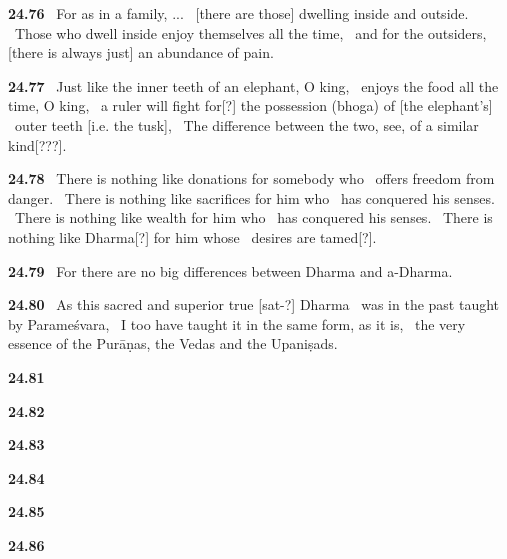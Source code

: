 \documentclass{article}
\begin{document}
\textbf{24.76}%
\ For as in a family, ...%
\ [there are those] dwelling inside and outside.%
\ Those who dwell inside enjoy themselves all the time,%
\ and for the outsiders, [there is always just] an abundance of pain.%


\textbf{24.77}%
\ Just like the inner teeth of an elephant, O king,%
\ enjoys the food all the time, O king,%
\ a ruler will fight for[?] the possession (bhoga) of [the elephant's]%
\                 outer teeth [i.e. the tusk],%
\ The difference between the two, see, of a similar kind[???].%


\textbf{24.78}%
\ There is nothing like donations for somebody who%
\                 offers freedom from danger.%
\ There is nothing like sacrifices for him who%
\                         has conquered his senses.%
\ There is nothing like wealth for him who%
\                         has conquered his senses.%
\ There is nothing like Dharma[?] for him whose%
\                         desires are tamed[?].%


\textbf{24.79}%
\ For there are no big differences between Dharma and a-Dharma.%


\textbf{24.80}%
\ As this sacred and superior true [sat-?] Dharma%
\                 was in the past taught by Parameśvara,%
\ I too have taught it in the same form, as it is,%
\                 the very essence of the Purāṇas, the Vedas and the Upaniṣads.%


\textbf{24.81}%


\textbf{24.82}%


\textbf{24.83}%


\textbf{24.84}%


\textbf{24.85}%


\textbf{24.86}%
\end{document}
